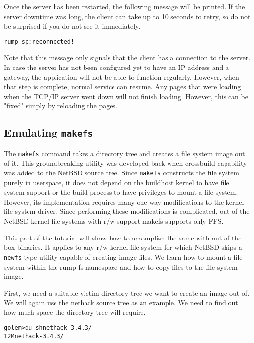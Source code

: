 Once the server has been restarted, the following message will be
printed.  If the server downtime was long, the client can take
up to 10 seconds to retry, so do not be surprised if you do not
see it immediately.

{\footnotesize
\begin{alltt}
rump_sp: reconnected!
\end{alltt}}

Note that this message only signals that the client has a connection
to the server.  In case the server has not been configured yet to
have an IP address and a gateway, the application will not be able
to function regularly.  However, when that step is complete, normal
service can resume.  Any pages that were loading when the TCP/IP
server went down will not finish loading.  However, this can be
"fixed" simply by reloading the pages.

\subsection{Emulating \texttt{makefs}}
\label{tutorial:makefs}

The \texttt{makefs} command takes a directory tree and creates a
file system image out of it.  This groundbreaking utility was
developed back when crossbuild capability was added to the NetBSD
source tree.  Since \verb+makefs+ constructs the file system purely
in userspace, it does not depend on the buildhost kernel to have
file system support or the build process to have privileges to
mount a file system.  However, its implementation requires many
one-way modifications to the kernel file system driver.  Since
performing these modifications is complicated, out of the NetBSD
kernel file systems with r/w support makefs supports only FFS.

This part of the tutorial will show how to accomplish the same with
out-of-the-box binaries.  It applies to any r/w kernel file system for which
NetBSD ships a \texttt{newfs}-type utility capable of creating
image files.  We learn how to mount a file system within the
rump fs namespace and how to copy files to the file system
image.

First, we need a suitable victim directory tree we want to create
an image out of.  We will again use the nethack source tree as an
example.  We need to find out how much space the directory tree
will require.

{\footnotesize
\begin{alltt}
golem> du -sh nethack-3.4.3/
12M     nethack-3.4.3/
\end{alltt}}

